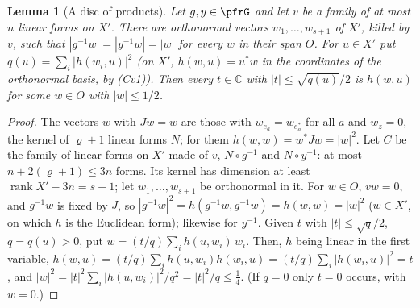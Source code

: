 \documentclass[10pt]{amsart}
\newtheorem{lemma}[theorem]{Lemma}
\theoremstyle{definition}
\theoremstyle{remark}
\newcommand{\C}{\mathbb C}
\begin{document}
\begin{lemma}[A disc of products]\label{prp:disc}
Let $g,y\in\pfrG$ and let $v$ be a family of at most $n$ linear forms on $X'$. There are orthonormal
vectors $w_1,\dots,w_{s+1}$ of $X'$, killed by $v$, such that $|g^{-1}w|=|y^{-1}w|=|w|$ for every $w$ in their
span $O$. For $u\in X'$ put $q(u)=\sum_i|h(w_i,u)|^2$ \textup{(}on $X'$, $h(w,u)=u^*w$ in the coordinates of
the orthonormal basis, by (Cv1)\textup{)}. Then every $t\in\C$ with $|t|\le\sqrt{q(u)}/2$ is $h(w,u)$ for some
$w\in O$ with $|w|\le1/2$.
\end{lemma}
\begin{proof}
The vectors $w$ with $Jw=w$ are those with $w_{e_a}=w_{e_a^*}$ for all $a$ and $w_z=0$, the kernel of
$\varrho+1$ linear forms $N$; for them $h(w,w)=w^*Jw=|w|^2$. Let $C$ be the family of linear forms on $X'$
made of $v$, $N\circ g^{-1}$ and $N\circ y^{-1}$: at most $n+2(\varrho+1)\le3n$ forms. Its kernel has
dimension at least $\operatorname{rank}X'-3n=s+1$; let $w_1,\dots,w_{s+1}$ be orthonormal in it. For $w\in O$,
$vw=0$, and $g^{-1}w$ is fixed by $J$, so $|g^{-1}w|^2=h(g^{-1}w,g^{-1}w)=h(w,w)=|w|^2$ ($w\in X'$, on which $h$
is the Euclidean form); likewise for $y^{-1}$. Given $t$ with $|t|\le\sqrt{q}/2$, $q=q(u)>0$, put
$w=(t/q)\sum_ih(u,w_i)\,w_i$. Then, $h$ being linear in the first variable, $h(w,u)=(t/q)\sum_ih(u,w_i)h(w_i,u)=
(t/q)\sum_i|h(w_i,u)|^2=t$, and $|w|^2=|t|^2\sum_i|h(u,w_i)|^2/q^2=|t|^2/q\le\frac14$. (If
$q=0$ only $t=0$ occurs, with $w=0$.)
\end{proof}
\end{document}
